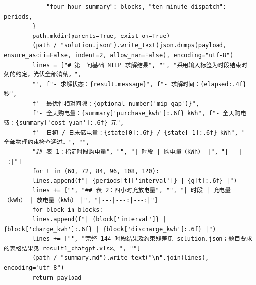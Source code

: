 \documentclass[UTF8]{ctexart}
\begin{document}
\begin{verbatim}
            "four_hour_summary": blocks, "ten_minute_dispatch": periods,
        }
        path.mkdir(parents=True, exist_ok=True)
        (path / "solution.json").write_text(json.dumps(payload, ensure_ascii=False, indent=2, allow_nan=False), encoding="utf-8")
        lines = ["# 第一问基础 MILP 求解结果", "", "采用输入标签为时段结束时刻的约定，光伏全部消纳。",
        "", f"- 求解状态：{result.message}", f"- 求解时间：{elapsed:.4f} 秒",
        f"- 最优性相对间隙：{optional_number('mip_gap')}",
        f"- 全天购电量：{summary['purchase_kwh']:.6f} kWh", f"- 全天购电费：{summary['cost_yuan']:.6f} 元",
        f"- 日初 / 日末储电量：{state[0]:.6f} / {state[-1]:.6f} kWh", "- 全部物理约束检查通过。", "",
        "## 表 1：指定时段购电量", "", "| 时段 | 购电量（kWh） |", "|---|---:|"]
        for t in (60, 72, 84, 96, 108, 120):
        lines.append(f"| {periods[t]['interval']} | {g[t]:.6f} |")
        lines += ["", "## 表 2：四小时充放电量", "", "| 时段 | 充电量（kWh） | 放电量（kWh） |", "|---|---:|---:|"]
        for block in blocks:
        lines.append(f"| {block['interval']} | {block['charge_kwh']:.6f} | {block['discharge_kwh']:.6f} |")
        lines += ["", "完整 144 时段结果及约束残差见 solution.json；题目要求的表格结果见 result1_chatgpt.xlsx。", ""]
        (path / "summary.md").write_text("\n".join(lines), encoding="utf-8")
        return payload
        

\end{verbatim}
\end{document}
